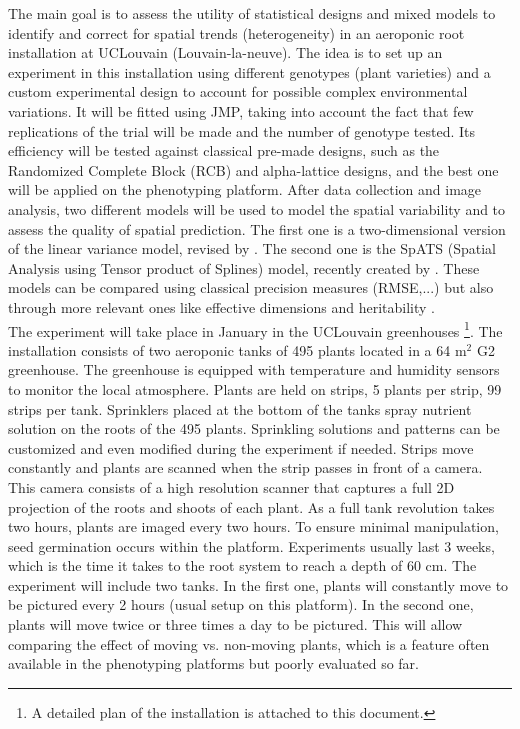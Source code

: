 The main goal is to assess the utility of statistical designs and mixed models to identify and correct for spatial trends (heterogeneity) in an aeroponic root installation at UCLouvain (Louvain-la-neuve). The idea is to set up an experiment in this installation using different genotypes (plant varieties) and a custom experimental design to account for possible complex environmental variations. It will be fitted using JMP, taking into account the fact that few replications of the trial will be made and the number of genotype tested. Its efficiency will be tested against classical pre-made designs, such as the Randomized Complete Block (RCB) and alpha-lattice designs, and the best one will be applied on the phenotyping platform. After data collection and image analysis, two different models will be used to model the spatial variability and to assess the quality of spatial prediction. The first one is a two-dimensional version of the linear variance model, revised by \textcite{piepho_linear_2010}. The second one is the SpATS (Spatial Analysis using Tensor product of Splines) model, recently created by \textcite{rodriguez-alvarez_correcting_2018}. These models can be compared using classical precision measures (RMSE,...) but also through more relevant ones like effective dimensions and heritability \parencite{oakey_joint_2006}.\\

The experiment will take place in January in the UCLouvain greenhouses \footnote{A detailed plan of the installation is attached to this document.}. The installation consists of two aeroponic tanks of 495 plants located in a 64 m$^2$ G2 greenhouse. The greenhouse is equipped with temperature and humidity sensors to monitor the local atmosphere. Plants are held on strips, 5 plants per strip, 99 strips per tank. Sprinklers placed at the bottom of the tanks spray nutrient solution on the roots of the 495 plants. Sprinkling solutions and patterns can be customized and even modified during the experiment if needed. Strips move constantly and plants are scanned when the strip passes in front of a camera. This camera consists of a high resolution scanner that captures a full 2D projection of the roots and shoots of each plant. As a full tank revolution takes two hours, plants are imaged every two hours. To ensure minimal manipulation, seed germination occurs within the platform. Experiments usually last 3 weeks, which is the time it takes to the root system to reach a depth of 60 cm. The experiment will include two tanks. In the first one, plants will constantly move to be pictured every 2 hours (usual setup on this platform). In the second one, plants will move twice or three times a day to be pictured. This will allow comparing the effect of moving vs. non-moving plants, which is a feature often available in the phenotyping platforms but poorly evaluated so far.\\

